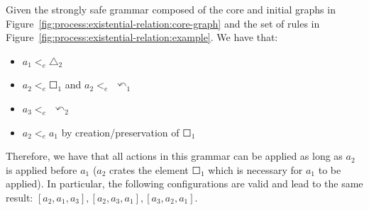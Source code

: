 \begin{example}\label{ex:process:existential-relation} Given the strongly safe grammar composed of the core and initial graphs in Figure~\ref{fig:process:existential-relation:core-graph} and the set of rules in Figure~\ref{fig:process:existential-relation:example}. We have that:

\begin{itemize}
  \item $a_1 <_e \triangle_2$
  \item $a_2 <_e \Square_1$ and $a_2 <_e$ $\curvearrowleft_1$
  \item $a_3 <_e$ $\curvearrowleft_2$
  \item $a_2 <_e a_1$ by creation/preservation of $\Square_1$
\end{itemize}

  Therefore, we have that all actions in this grammar can be applied as long as $a_2$ is applied before $a_1$ ($a_2$ crates the element $\Square_1$ which is necessary for $a_1$ to be applied).
  In particular, the following configurations are valid and lead to the same result: $[a_2,a_1,a_3],[a_2,a_3,a_1],[a_3,a_2,a_1]$.


\end{example}
